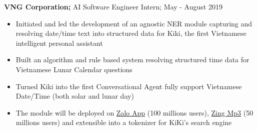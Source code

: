 \documentclass[a4paper,11pt]{article}
\begin{document}
\begin{flushleft}
	\textbf{VNG Corporation; } AI Software Engineer Intern; May - August 2019 \\
	\vspace{-\topsep}
	\begin{itemize}
		\setlength{\parskip}{0pt}
		\setlength{\itemsep}{0pt plus 1pt}
		\item Initiated and led the development of an agnostic NER module capturing and resolving date/time text into structured data for Kiki, the first Vietnamese intelligent personal assistant
		\item Built an algorithm and rule based system resolving structured time data for Vietnamese Lunar Calendar questions  
		\item Turned Kiki into the first Conversational Agent fully support Vietnamese Date/Time (both solar and lunar day) 
		\item  The module will be deployed on  \href{https://oa.zalo.me/home}{Zalo App} (100 millions users),  \href{https://mp3.zing.vn/}{Zing Mp3} (50 millions users) and extensible into a tokenizer for KiKi's search engine
	\end{itemize}
\vspace{-\topsep}
\centering{\noindent\makebox{\rule{8cm}{1.5pt}}}
\end{flushleft} 
\end{document}
